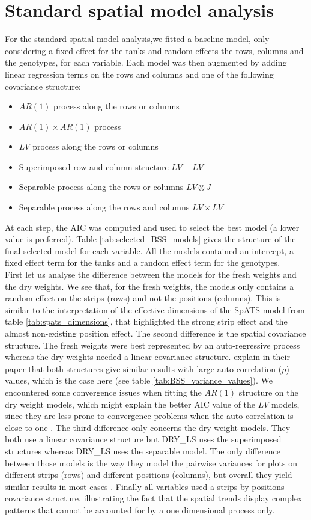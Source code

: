 \section{Standard spatial model analysis}
For the standard spatial model analysis,we fitted a baseline model, only considering a fixed effect for the tanks and random effects the rows, columns and the genotypes, for each variable. Each model was then augmented by adding linear regression terms on the rows and columns and one of the following covariance structure:
\begin{itemize}
\item $AR(1)$ process along the rows or columns
\item $AR(1) \times AR(1)$ process
\item $LV$ process along the rows or columns
\item Superimposed row and column structure $LV + LV$
\item Separable process along the rows or columns $LV\otimes J$
\item Separable process along the rows and columns $LV \times LV$
\end{itemize}
At each step, the AIC  was computed and used to select the best model (a lower value is preferred). Table \ref{tab:selected_BSS_models} gives the structure of the final selected model for each variable. All the models contained an intercept, a fixed effect term for the tanks and a random effect term for the genotypes.\\

First let us analyse the difference between the models for the fresh weights and the dry weights. We see that, for the fresh weights, the models only contains a random effect on the strips (rows) and not the positions (columns). This is similar to the interpretation of the effective dimensions of the SpATS model from table \ref{tab:spats_dimensions}, that highlighted the strong strip effect and the almost non-existing position effect. The second difference is the spatial covariance structure. The fresh weights were best represented by an auto-regressive process whereas the dry weights needed a linear covariance structure. \textcite{piepho_linear_2010} explain in their paper that both structures give similar results with large auto-correlation ($\rho$) values, which is the case here (see table \ref{tab:BSS_variance_values}). We encountered some convergence issues when fitting the $AR(1)$ structure on the dry weight models, which might explain the better AIC value of the $LV$ models, since they are less prone to convergence problems when the auto-correlation is close to one \parencite{piepho_linear_2010}. The third difference only concerns the dry weight models. They both use a linear covariance structure but DRY\_LS uses the superimposed structures whereas DRY\_LS uses the separable model. The only difference between those models is the way they model the pairwise variances for plots on different strips (rows) and different positions (columns), but overall they yield similar results in most cases \parencite{piepho_linear_2010}. Finally all variables used a strips-by-positions covariance structure, illustrating the fact that the spatial trends display complex patterns that cannot be accounted for by a one dimensional process only.

